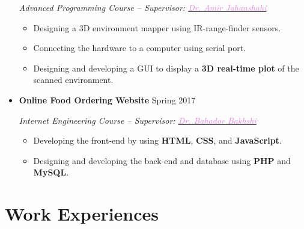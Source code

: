 \documentclass[11pt,a4paper,roman]{moderncv} %
\begin{document}
\begin{itemize}
	\emph{Advanced Programming Course -- Supervisor: \href{https://mbtech.aut.ac.ir/people/amir-jahanshahi}{\textcolor{violet}{Dr. Amir Jahanshahi}}}
	
	\begin{itemize}
		\item Designing a 3D environment mapper using IR-range-finder sensors.
		\item Connecting the hardware to a computer using serial port.
		\item Designing and developing a GUI to display a \textbf{3D real-time plot} of the scanned environment.
	\end{itemize}
	
	\vspace{3pt}
	
	\item \textbf{Online Food Ordering Website} \hfill Spring 2017
	
	\emph{Internet Engineering Course -- Supervisor: \href{https://ceit.aut.ac.ir/~bakhshis}{\textcolor{violet}{Dr. Bahador Bakhshi}}}
	
	\begin{itemize}
		\item Developing the front-end by using \textbf{HTML}, \textbf{CSS}, and \textbf{JavaScript}.
		\item Designing and developing the back-end and database using \textbf{PHP} and \textbf{MySQL}.
	\end{itemize}
	
	
\end{itemize}

\section{Work Experiences}
\end{document}
